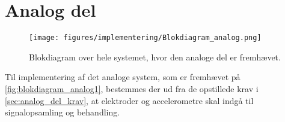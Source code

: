 \section{Analog del}
\begin{figure}[H]
\centering
\texttt{[image: figures/implementering/Blokdiagram\_analog.png]}
\caption{Blokdiagram over hele systemet, hvor den analoge del er fremhævet.}
\label{fig:blokdiagram_analog1}
\end{figure}

\noindent
Til implementering af det analoge system, som er fremhævet på \autoref{fig:blokdiagram_analog1}, bestemmes der ud fra de opstillede krav i \autoref{sec:analog_del_krav}, at elektroder og accelerometre skal indgå til signalopsamling og behandling. 









